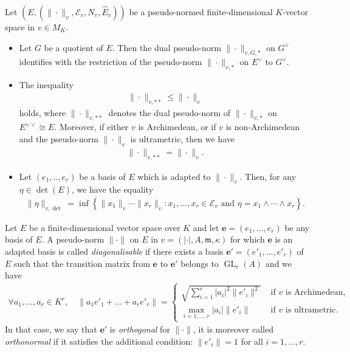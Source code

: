 \documentclass [11pt,reqno]{amsart}
\newcommand{\1}{\mathmybb{1}}
\def\cE{{\mathcal{E}}}
\def\cN{{\mathcal{N}}}
\def\m{\mathfrak m}
\def\diag{\operatorname{diag}}
\def\GL{\operatorname{GL}}
\begin{document}
\begin{proposition}
Let $(E,(\|\cdot\|_v,\cE_v,N_v,\widehat{E}_v))$ be a pseudo-normed finite-dimensional $K$-vector space in $v\in M_{K}$.
\begin{itemize}
	\item[(1)]\label{prop:correspondence_dual_quotient} Let $G$ be a quotient of $E$. Then the dual pseudo-norm $\|\cdot\|_{v,G,\ast}$ on $G^{\vee}$ identifies with the restriction of the pseudo-norm $\|\cdot\|_{v,\ast}$ on $E^{\vee}$ to $G^{\vee}$.
	\item[(2)]\label{prop:comparaison_double_dual_semi-norm} The inequality 
\begin{align*}
\|\cdot\|_{v,\ast\ast} \leq \|\cdot\|_v
\end{align*}
holds, where $\|\cdot\|_{v,\ast\ast}$ denotes the dual pseudo-norm of $\|\cdot\|_{v,\ast}$ on $E^{\vee\vee}\cong E$. Moreover, if either $v$ is Archimedean, or if $v$ is non-Archimedean and the pseudo-norm $\|\cdot\|_v$ is ultrametric, then we have 
\begin{align*}
\|\cdot\|_{v,\ast\ast} = \|\cdot\|_v.
\end{align*}
	\item[(3)]\label{prop:Hadamrd_inequality_local_semi-norm} Let $(e_1,..,e_r)$ be a basis of $E$ which is adapted to $\|\cdot\|_v$. Then, for any $\eta\in \det(E)$, we have the equality
\begin{align*}
\|\eta\|_{v,\det} = \inf\left\{\|x_1\|_v\cdots\|x_r\|_v : x_1,...,x_r \in \cE_v \text{ and } \eta = x_1\wedge\cdots\wedge x_r\right\}.
\end{align*}
\end{itemize}
\end{proposition}

\begin{definition}
\label{def:diagonalisable_local_semi-norm}
Let $E$ be a finite-dimensional vector space over $K$ and let $\mathbf{e}=(e_1,...,e_r)$ be any basis of $E$. A pseudo-norm $\|\cdot\|$ on $E$ in $v=(|\cdot|, A,\m,\kappa)$ for which $\mathbf{e}$ is an adapted basis is called \emph{diagonalisable} if there exists a basis $\mathbf{e'}=(e'_1,...,e'_r)$ of $E$ such that the transition matrix from $\mathbf{e}$ to $\mathbf{e'}$ belongs to $\GL_{r}(A)$ and we have
\begin{align*}
\forall a_1,...,a_r\in K^{r}, \quad \|a_1e'_{1}+...+a_{r}e'_{r}\|=\left\{\begin{matrix}
\displaystyle\sqrt{\sum_{i=1}^{r}|a_i|^{2}\|e'_{i}\|^2 }&\text{ if } v \text{ is Archimedean},\\
\displaystyle\max_{i=1,...,r} |a_i|\|e'_{i}\|&\text{ if } v \text{ is ultrametric}.\end{matrix}\right.
\end{align*}
In that case, we say that $\mathbf{e'}$ is \emph{orthogonal} for $\|\cdot\|$, it is moreover called \emph{orthonormal} if it satisfies the additional condition: $\|e'_i\|=1$ for all $i=1,...,r$. %
\end{definition}
\end{document}
